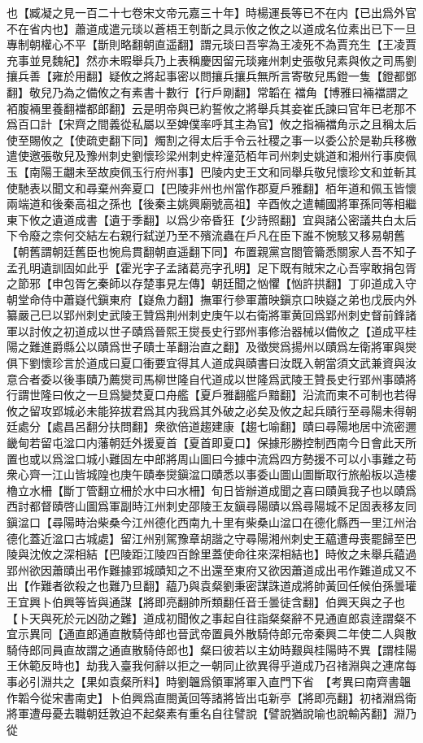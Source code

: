 也【臧凝之見一百二十七卷宋文帝元嘉三十年】時楊運長等已不在内【已出爲外官不在省内也】蕭道成遣元琰以蒼梧王刳斮之具示攸之攸之以道成名位素出已下一旦專制朝權心不平【斮則略翻朝直遥翻】謂元琰曰吾寜為王凌死不為賈充生【王凌賈充事並見魏紀】然亦未暇舉兵乃上表稱慶因留元琰雍州刺史張敬兒素與攸之司馬劉攘兵善【雍於用翻】疑攸之將起事密以問攘兵攘兵無所言寄敬兒馬鐙一隻【鐙都鄧翻】敬兒乃為之備攸之有素書十數行【行戶剛翻】常韜在襠角【博雅曰裲襠謂之袹腹裲里養翻襠都郎翻】云是明帝與已約誓攸之將舉兵其妾崔氏諫曰官年已老那不爲百口計【宋齊之間義從私屬以至婢僕率呼其主為官】攸之指裲襠角示之且稱太后使至賜攸之【使疏吏翻下同】燭割之得太后手令云社稷之事一以委公於是勒兵移檄遣使邀張敬兒及豫州刺史劉懷珍梁州刺史梓潼范栢年司州刺史姚道和湘州行事庾佩玉【南陽王翽未至故庾佩玉行府州事】巴陵内史王文和同舉兵敬兒懷珍文和並斬其使馳表以聞文和尋棄州奔夏口【巴陵非州也州當作郡夏戶雅翻】栢年道和佩玉皆懷兩端道和後秦高祖之孫也【後秦主姚興廟號高祖】辛酉攸之遣輔國將軍孫同等相繼東下攸之遺道成書【遺于季翻】以爲少帝昏狂【少詩照翻】宜與諸公密議共白太后下令廢之柰何交結左右親行弑逆乃至不殯流蟲在戶凡在臣下誰不惋駭又移易朝舊【朝舊謂朝廷舊臣也惋烏貫翻朝直遥翻下同】布置親黨宫閤管籥悉關家人吾不知子孟孔明遺訓固如此乎【霍光字子孟諸葛亮字孔明】足下既有賊宋之心吾寜敢捐包胥之節邪【申包胥乞秦師以存楚事見左傳】朝廷聞之忷懼【忷許拱翻】丁卯道成入守朝堂命侍中蕭嶷代鎭東府【嶷魚力翻】撫軍行參軍蕭映鎭京口映嶷之弟也戊辰内外纂嚴己巳以郢州刺史武陵王贊爲荆州刺史庚午以右衛將軍黄回爲郢州刺史督前鋒諸軍以討攸之初道成以世子賾爲晉熙王爕長史行郢州事修治器械以備攸之【道成平桂陽之難進爵縣公以賾爲世子賾士革翻治直之翻】及徵爕爲揚州以賾爲左衛將軍與爕俱下劉懷珍言於道成曰夏口衝要宜得其人道成與賾書曰汝既入朝當須文武兼資與汝意合者委以後事賾乃薦爕司馬柳世隆自代道成以世隆爲武陵王贊長史行郢州事賾將行謂世隆曰攸之一旦爲變焚夏口舟艦【夏戶雅翻艦戶黯翻】沿流而東不可制也若得攸之留攻郢城必未能猝拔君爲其内我爲其外破之必矣及攸之起兵賾行至尋陽未得朝廷處分【處昌呂翻分扶問翻】衆欲倍道趨建康【趨七喻翻】賾曰尋陽地居中流密邇畿甸若留屯湓口内藩朝廷外援夏首【夏首即夏口】保據形勝控制西南今日會此天所置也或以爲湓口城小難固左中郎將周山圖曰今據中流爲四方勢援不可以小事難之苟衆心齊一江山皆城隍也庚午賾奉爕鎭湓口賾悉以事委山圖山圖斷取行旅船板以造樓櫓立水柵【斷丁管翻立柵於水中曰水柵】旬日皆辦道成聞之喜曰賾眞我子也以賾爲西討都督賾啓山圖爲軍副時江州刺史邵陵王友鎭尋陽賾以爲尋陽城不足固表移友同鎭湓口【尋陽時治柴桑今江州德化西南九十里有柴桑山湓口在德化縣西一里江州治德化蓋近湓口古城處】留江州别駕豫章胡諧之守尋陽湘州刺史王藴遭母喪罷歸至巴陵與沈攸之深相結【巴陵距江陵四百餘里蓋使命往來深相結也】時攸之未舉兵藴過郢州欲因蕭賾出弔作難據郢城賾知之不出還至東府又欲因蕭道成出弔作難道成又不出【作難者欲殺之也難乃旦翻】藴乃與袁粲劉秉密謀誅道成將帥黃回任候伯孫曇瓘王宜興卜伯興等皆與通謀【將即亮翻帥所類翻任音壬曇徒含翻】伯興天與之子也【卜天與死於元凶劭之難】道成初聞攸之事起自往詣粲粲辭不見通直郎袁逹謂粲不宜示異同【通直郎通直散騎侍郎也晉武帝置員外散騎侍郎元帝秦興二年使二人與散騎侍郎同員直故謂之通直散騎侍郎也】粲曰彼若以主幼時艱與桂陽時不異【謂桂陽王休範反時也】劫我入臺我何辭以拒之一朝同止欲異得乎道成乃召禇淵與之連席每事必引淵共之【果如袁粲所料】時劉韞爲領軍將軍入直門下省　【考異曰南齊書韞作韜今從宋書南史】卜伯興爲直閤黃回等諸將皆出屯新亭【將即亮翻】初禇淵爲衛將軍遭母憂去職朝廷敦迫不起粲素有重名自往譬說【譬說猶說喻也說輸芮翻】淵乃從
